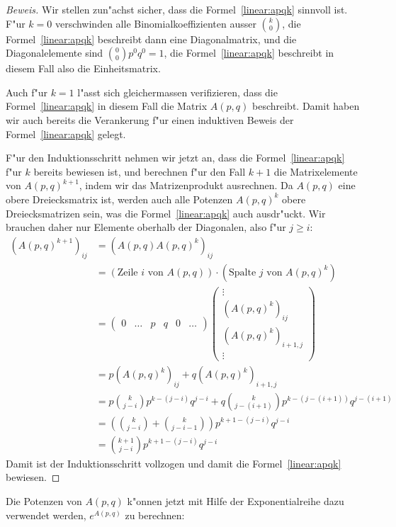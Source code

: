 \begin{proof}[Beweis]
Wir stellen zun"achst sicher, dass die Formel~\eqref{linear:apqk} sinnvoll ist.
F"ur $k=0$ verschwinden alle Binomialkoeffizienten ausser $\binom{k}{0}$,
die Formel~\eqref{linear:apqk} beschreibt dann eine Diagonalmatrix, und
die Diagonalelemente sind $\binom{0}{0}p^0q^0=1$, die Formel~\eqref{linear:apqk}
beschreibt in diesem Fall also die Einheitsmatrix.

Auch f"ur $k=1$ l"asst sich gleichermassen verifizieren, dass die
Formel~\eqref{linear:apqk} in diesem Fall die Matrix $A(p,q)$ beschreibt.
Damit haben wir auch bereits die Verankerung f"ur einen induktiven
Beweis der Formel~\eqref{linear:apqk} gelegt.

F"ur den Induktionsschritt nehmen wir jetzt an, dass die
Formel~\eqref{linear:apqk} f"ur $k$ bereits bewiesen ist, und berechnen
f"ur den Fall $k+1$
die Matrixelemente von $A(p,q)^{k+1}$, indem wir das Matrizenprodukt
ausrechnen.
Da $A(p,q)$ eine obere Dreiecksmatrix ist, werden auch alle Potenzen
$A(p,q)^k$ obere Dreiecksmatrizen sein, was die Formel~\eqref{linear:apqk}
auch ausdr"uckt.
Wir brauchen daher nur Elemente oberhalb der Diagonalen, also f"ur $j\ge i$:
\begin{align*}
(A(p,q)^{k+1})_{ij}
&=
(A(p,q)A(p,q)^k)_{ij}
\\
&=
(\text{Zeile $i$ von $A(p,q)$})
\cdot
(\text{Spalte $j$ von $A(p,q)^k$})
\\
&=
\begin{pmatrix}
0&\dots&p&q&0&\dots
\end{pmatrix}
\begin{pmatrix}
\vdots\\
(A(p,q)^k)_{ij}\\
(A(p,q)^k)_{i+1,j}\\
\vdots
\end{pmatrix}
\\
&=
p(A(p,q)^k)_{ij}
+
q(A(p,q)^k)_{i+1,j}
\\
&=
p\binom{k}{j-i}p^{k-(j-i)}q^{j-i}
+
q\binom{k}{j-(i+1)}p^{k-(j-(i+1))}q^{j-(i+1)}
\\
&=
\left(\binom{k}{j-i}+\binom{k}{j-i-1}\right) p^{k+1-(j-i)}q^{j-i}
\\
&=
\binom{k+1}{j-i} p^{k+1-(j-i)}q^{j-i}
\end{align*}
Damit ist der Induktionsschritt vollzogen und damit die
Formel~\eqref{linear:apqk} bewiesen.
\end{proof}

Die Potenzen von $A(p,q)$ k"onnen jetzt mit Hilfe der Exponentialreihe
dazu verwendet werden, $e^{A(p,q)}$ zu berechnen:

